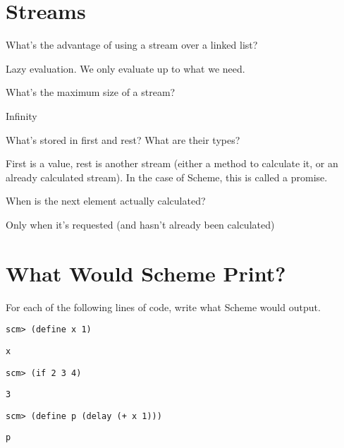 \documentclass{exam}
\begin{document}
\section{Streams}
\begin{questions}
\begin{blocksection}
\question What's the advantage of using a stream over a linked list?
\begin{solution}[0.5in] 
Lazy evaluation. We only evaluate up to what we need.
\end{solution}

\question What's the maximum size of a stream?
\begin{solution}[0.5in]
Infinity
\end{solution}

\question What's stored in first and rest? What are their types? 
\begin{solution}[0.5in]
First is a value, rest is another stream (either a method to calculate it, or an already calculated stream). In the case of Scheme, this is called a promise.
\end{solution}

\question When is the next element actually calculated?
\begin{solution}[.5in]
Only when it's requested (and hasn't already been calculated)
\end{solution}
\end{blocksection}


\section{What Would Scheme Print?}
\begin{blocksection}
\question For each of the following lines of code, write what Scheme would output.

\begin{lstlisting}
scm> (define x 1)
\end{lstlisting}
\begin{solution}[.45in]
\texttt{x}
\end{solution}

\begin{lstlisting}
scm> (if 2 3 4)
\end{lstlisting}
\begin{solution}[.45in]
\texttt{3}
\end{solution}

\begin{lstlisting}
scm> (define p (delay (+ x 1)))
\end{lstlisting}
\begin{solution}[.45in]
\begin{lstlisting}
p
\end{lstlisting}
\end{solution}


\end{blocksection}
\end{questions}
\end{document}
